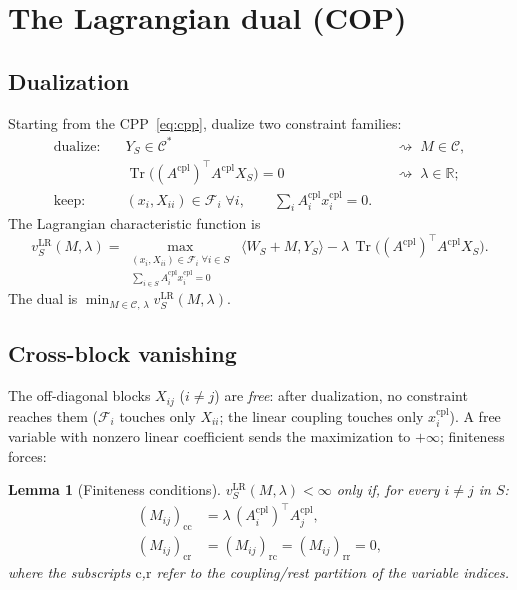 \documentclass[11pt]{article}
\newtheorem{lemma}{Lemma}
\theoremstyle{definition}
\newcommand{\CP}{\mathcal{C}^{*}}
\newcommand{\COP}{\mathcal{C}}
\newcommand{\R}{\mathbb{R}}
\newcommand{\inner}[2]{\langle #1, #2 \rangle}
\newcommand{\Tr}{\operatorname{Tr}}
\newcommand{\xcom}{x^{\mathrm{cpl}}}
\newcommand{\Acom}{A^{\mathrm{cpl}}}
\newcommand{\liftset}{\mathcal{F}}
\newcommand{\vlr}{v^{\mathrm{LR}}}
\begin{document}
\section{The Lagrangian dual (COP)}
\label{sec:dual}

\subsection{Dualization}

Starting from the CPP~\eqref{eq:cpp}, dualize two constraint families:
\begin{align*}
\text{dualize:}\quad
&Y_S\in\CP &&\rightsquigarrow\; M\in\COP,\\
&\Tr\!\bigl((\Acom)^{\top}\Acom X_S\bigr)=0
  &&\rightsquigarrow\; \lambda\in\R;\\
\text{keep:}\quad
&(x_i,X_{ii})\in\liftset_i\;\forall i,
\qquad\textstyle\sum_i\Acom_i\xcom_i=0.
\end{align*}
The Lagrangian characteristic function is
\begin{equation}
\vlr_S(M,\lambda)=\max_{\substack{(x_i,X_{ii})\in\liftset_i\;\forall i\in S\\
\sum_{i\in S}\Acom_i\xcom_i=0}}\;
\inner{W_S+M}{Y_S}-\lambda\,\Tr\!\bigl((\Acom)^{\top}\Acom X_S\bigr).
\label{eq:lagrangian}
\end{equation}
The dual is
$\min_{M\in\COP,\,\lambda}\vlr_S(M,\lambda)$.

\subsection{Cross-block vanishing}

The off-diagonal blocks $X_{ij}$ ($i\neq j$) are \emph{free}: after
dualization, no constraint reaches them ($\liftset_i$ touches only
$X_{ii}$; the linear coupling touches only $\xcom_i$).  A free variable
with nonzero linear coefficient sends the maximization to $+\infty$;
finiteness forces:

\begin{lemma}[Finiteness conditions]
\label{lem:vanish}
$\vlr_S(M,\lambda)<\infty$ only if, for every $i\neq j$ in $S$:
\begin{align}
(M_{ij})_{\mathrm{cc}}&=\lambda\,(\Acom_i)^{\top}\Acom_j,
\label{eq:fin-cc}\\
(M_{ij})_{\mathrm{cr}}&=(M_{ij})_{\mathrm{rc}}
=(M_{ij})_{\mathrm{rr}}=0,
\label{eq:fin-rest}
\end{align}
where the subscripts $\mathrm{c}$,$\mathrm{r}$ refer to the
coupling/rest partition of the variable indices.
\end{lemma}
\end{document}
